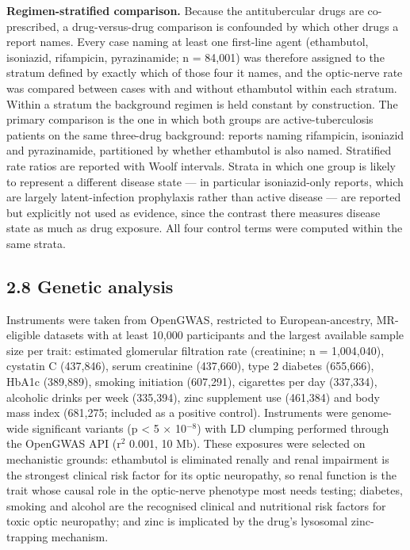 \documentclass[utf8]{FrontiersinVancouver}
\begin{document}
\textbf{Regimen-stratified comparison.} Because the antitubercular drugs are co-prescribed, a drug-versus-drug comparison is confounded by which other drugs a report names. Every case naming at least one first-line agent (ethambutol, isoniazid, rifampicin, pyrazinamide; n = 84,001) was therefore assigned to the stratum defined by exactly which of those four it names, and the optic-nerve rate was compared between cases with and without ethambutol within each stratum. Within a stratum the background regimen is held constant by construction. The primary comparison is the one in which both groups are active-tuberculosis patients on the same three-drug background: reports naming rifampicin, isoniazid and pyrazinamide, partitioned by whether ethambutol is also named. Stratified rate ratios are reported with Woolf intervals. Strata in which one group is likely to represent a different disease state --- in particular isoniazid-only reports, which are largely latent-infection prophylaxis rather than active disease --- are reported but explicitly not used as evidence, since the contrast there measures disease state as much as drug exposure. All four control terms were computed within the same strata.

\subsection{2.8 Genetic analysis}

Instruments were taken from OpenGWAS, restricted to European-ancestry, MR-eligible datasets with at least 10,000 participants and the largest available sample size per trait: estimated glomerular filtration rate (creatinine; n = 1,004,040), cystatin C (437,846), serum creatinine (437,660), type 2 diabetes (655,666), HbA1c (389,889), smoking initiation (607,291), cigarettes per day (337,334), alcoholic drinks per week (335,394), zinc supplement use (461,384) and body mass index (681,275; included as a positive control). Instruments were genome-wide significant variants (p < 5 $\times$ 10$^{-8}$) with LD clumping performed through the OpenGWAS API (r$^{2}$ 0.001, 10 Mb). These exposures were selected on mechanistic grounds: ethambutol is eliminated renally and renal impairment is the strongest clinical risk factor for its optic neuropathy, so renal function is the trait whose causal role in the optic-nerve phenotype most needs testing; diabetes, smoking and alcohol are the recognised clinical and nutritional risk factors for toxic optic neuropathy; and zinc is implicated by the drug's lysosomal zinc-trapping mechanism.
\end{document}
